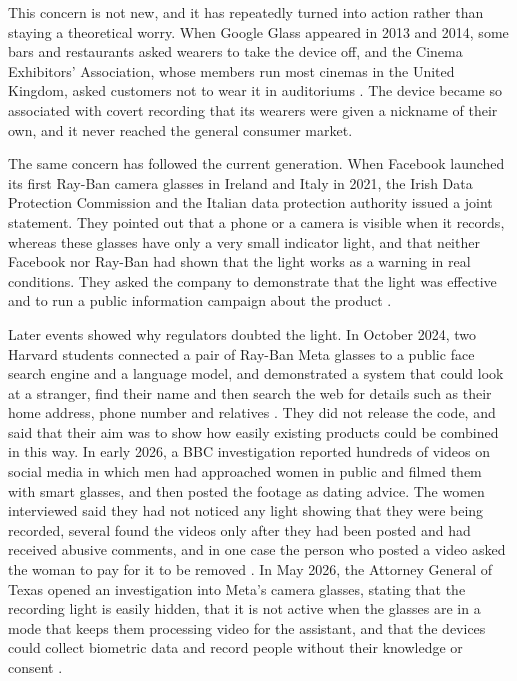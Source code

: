 This concern is not new, and it has repeatedly turned into action rather than staying a
theoretical worry. When Google Glass appeared in 2013 and 2014, some bars and restaurants
asked wearers to take the device off, and the Cinema Exhibitors' Association, whose
members run most cinemas in the United Kingdom, asked customers not to wear it in
auditoriums \cite{nbc2014glass}. The device became so associated with covert recording
that its wearers were given a nickname of their own, and it never reached the general
consumer market.

The same concern has followed the current generation. When Facebook launched its first
Ray-Ban camera glasses in Ireland and Italy in 2021, the Irish Data Protection Commission
and the Italian data protection authority issued a joint statement. They pointed out that
a phone or a camera is visible when it records, whereas these glasses have only a very
small indicator light, and that neither Facebook nor Ray-Ban had shown that the light
works as a warning in real conditions. They asked the company to demonstrate that the
light was effective and to run a public information campaign about the product
\cite{dpc2021view}.

Later events showed why regulators doubted the light. In October 2024, two Harvard
students connected a pair of Ray-Ban Meta glasses to a public face search engine and a
language model, and demonstrated a system that could look at a stranger, find their name
and then search the web for details such as their home address, phone number and
relatives \cite{cox2024ixray}. They did not release the code, and said that their aim was
to show how easily existing products could be combined in this way. In early 2026, a BBC
investigation reported hundreds of videos on social media in which men had approached
women in public and filmed them with smart glasses, and then posted the footage as dating
advice. The women interviewed said they had not noticed any light showing that they were
being recorded, several found the videos only after they had been posted and had received
abusive comments, and in one case the person who posted a video asked the woman to pay
for it to be removed \cite{bbc2026glasses}. In May 2026, the Attorney General of Texas
opened an investigation into Meta's camera glasses, stating that the recording light is
easily hidden, that it is not active when the glasses are in a mode that keeps them
processing video for the assistant, and that the devices could collect biometric data and
record people without their knowledge or consent \cite{cbs2026texas}.

